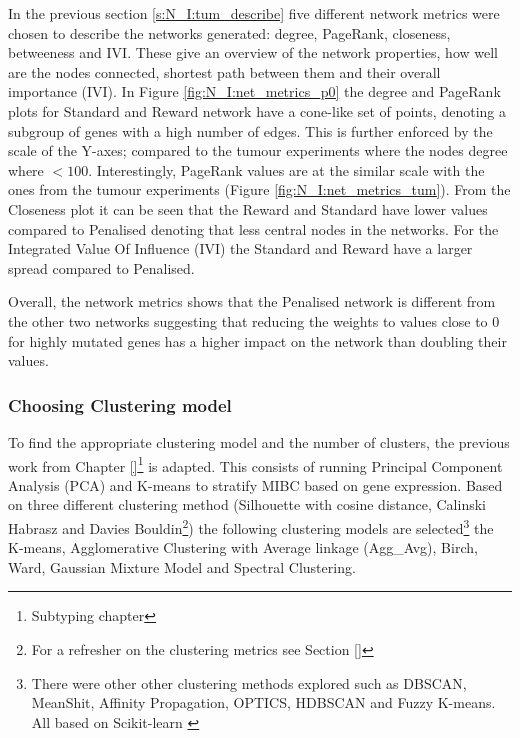 In the previous section \ref{s:N_I:tum_describe} five different network metrics were chosen to describe the networks generated: degree, PageRank, closeness, betweeness and IVI. These give an overview of the network properties, how well are the nodes connected, shortest path between them and their overall importance (IVI). In Figure \ref{fig:N_I:net_metrics_p0} the degree and PageRank plots for Standard and Reward network have a cone-like set of points, denoting a subgroup of genes with a high number of edges. This is further enforced by the scale of the Y-axes; compared to the tumour experiments where the nodes degree where $<100$. Interestingly, PageRank values are at the similar scale with the ones from the tumour experiments (Figure \ref{fig:N_I:net_metrics_tum}). From the Closeness plot it can be seen that the Reward and Standard have lower values compared to Penalised denoting that less central nodes in the networks. For the Integrated Value Of Influence (IVI) the Standard and Reward have a larger spread compared to Penalised. 

Overall, the network metrics shows that the Penalised network is different from the other two networks suggesting that reducing the weights to values close to 0 for highly mutated genes has a higher impact on the network than doubling their values.

\subsubsection{Choosing Clustering model} \label{s:p0:clustering_analysis}

To find the appropriate clustering model and the number of clusters, the previous work from Chapter \ref{}\footnote{Subtyping chapter} is adapted. This consists of running Principal Component Analysis (PCA) and K-means to stratify MIBC based on gene expression. Based on three different clustering method (Silhouette with cosine distance, Calinski Habrasz and Davies Bouldin\footnote{For a refresher on the clustering metrics see Section \ref{}}) the following clustering models are selected\footnote{There were other other clustering methods explored such as DBSCAN, MeanShit, Affinity Propagation, OPTICS, HDBSCAN and Fuzzy K-means. All based on Scikit-learn \cite{Scikit-learn_undated-ax}} the K-means, Agglomerative Clustering with Average linkage (Agg\_Avg), Birch, Ward, Gaussian Mixture Model and Spectral Clustering. 

